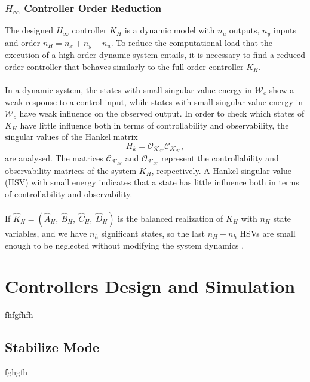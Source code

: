 \subsubsection{$H_\infty$ Controller Order Reduction}
The designed $H_{\infty}$ controller $K_H$ is a dynamic model with $n_u$ outputs, $n_y$ inputs and
order $n_H = n_{x} + n_{y} + n_{u}$. To reduce the computational load that the execution of a high-order dynamic system entails, it is necessary to find a reduced order controller that behaves similarly to the full order controller $K_H$. 
\\\\
In a dynamic system, the states with small singular value energy in $\mathcal{W}_{c}$ show a weak response to a control input, while states with small singular value energy in $\mathcal{W}_{o}$ have weak influence on the observed output. In order to check which states of $K_H$ have little influence both in terms of controllability and observability, the singular values of the Hankel matrix
\begin{equation}
H_{k} = \mathcal{O_{K_H}}\mathcal{C_{K_H}},
\end{equation}
are analysed. The matrices $\mathcal{C_{K_H}}$ and $\mathcal{O_{K_H}}$ represent the controllability and observability matrices of the system $K_H$, respectively. A Hankel singular value (HSV) with small energy indicates that a state has little influence both in terms of controllability and observability.
\\\\
If $\hat{K}_{H}=(\hat{A}_H,\ \hat{B}_H,\ \hat{C}_H,\ \hat{D}_H)$ is the balanced realization of $K_H$ with $n_H$ state variables, and we have $n_h$ significant states, so the last $n_{H}-n_{h}$ HSVs are small enough to be neglected without modifying the system dynamics \cite{Skogestad2005}. 

\section{Controllers Design and Simulation}
\label{sec:controldesign}
fhfgfhfh
\subsection{Stabilize Mode}
fghgfh
